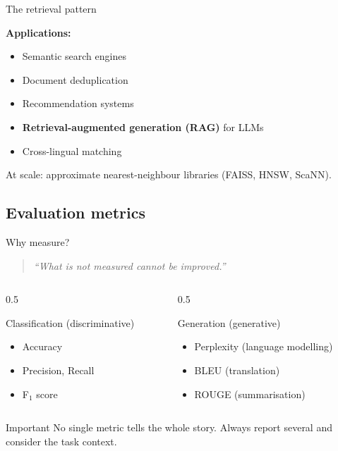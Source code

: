 \documentclass[11pt,aspectratio=169]{beamer}
\begin{document}
\begin{frame}{The retrieval pattern}
\begin{center}
\large
{}
\end{center}
\vfill
\textbf{Applications:}
\begin{itemize}
    \item Semantic search engines
    \item Document deduplication
    \item Recommendation systems
    \item \textbf{Retrieval-augmented generation (RAG)} for LLMs
    \item Cross-lingual matching
\end{itemize}
\vfill
At scale: approximate nearest-neighbour libraries (FAISS, HNSW, ScaNN).
\end{frame}

\subsection{Evaluation metrics}

\begin{frame}{Why measure?}
\begin{quote}
\emph{``What is not measured cannot be improved.''}
\end{quote}
\vfill
\begin{columns}[T]
\begin{column}{0.5\textwidth}
\begin{block}{Classification (discriminative)}
\begin{itemize}
    \item Accuracy
    \item Precision, Recall
    \item F$_1$ score
\end{itemize}
\end{block}
\end{column}
\begin{column}{0.5\textwidth}
\begin{block}{Generation (generative)}
\begin{itemize}
    \item Perplexity (language modelling)
    \item BLEU (translation)
    \item ROUGE (summarisation)
\end{itemize}
\end{block}
\end{column}
\end{columns}
\vfill
\begin{alertblock}{Important}
No single metric tells the whole story. Always report several and consider the task context.
\end{alertblock}
\end{frame}
\end{document}
